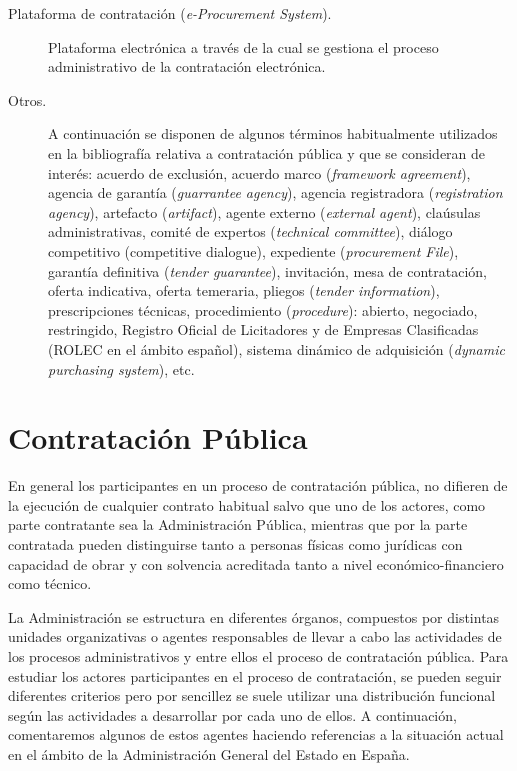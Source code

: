 \begin{description}
\item [Plataforma de contratación (\textit{e-Procurement System}).] Plataforma electrónica a través de la cual se gestiona
el proceso administrativo de la contratación electrónica.

\item [Otros.] A continuación se disponen de algunos términos habitualmente utilizados
en la bibliografía relativa a contratación pública y que se consideran de interés:
acuerdo de exclusión, acuerdo marco (\textit{framework agreement}), 
agencia de garantía (\textit{guarrantee agency}), agencia registradora (\textit{registration agency}), 
artefacto (\textit{artifact}), agente externo (\textit{external agent}),
claúsulas administrativas, comité de expertos (\textit{technical committee}), 
diálogo competitivo (competitive dialogue), expediente (\textit{procurement File}), 
garantía definitiva (\textit{tender guarantee}), invitación, mesa de contratación,
oferta indicativa, oferta temeraria, pliegos (\textit{tender information}), prescripciones técnicas,
procedimiento (\textit{procedure}): abierto, negociado, restringido, Registro Oficial de Licitadores y de Empresas Clasificadas (\gls{ROLEC} en el ámbito español), sistema dinámico de adquisición 
(\textit{dynamic purchasing system}), etc.
\end{description}

\section{Contratación Pública}
En general los participantes en un proceso de contratación pública, no difieren de la ejecución
de cualquier contrato habitual salvo que uno de los actores, como parte contratante sea la Administración Pública, 
mientras que por la parte contratada pueden distinguirse tanto a personas físicas como jurídicas con capacidad de obrar y con solvencia acreditada tanto
a nivel económico-financiero como técnico.

La Administración se estructura en diferentes órganos, compuestos por distintas unidades organizativas o 
agentes responsables de llevar a cabo las actividades de los procesos administrativos y entre ellos
el proceso de contratación pública. Para estudiar los actores participantes en el proceso de contratación, se pueden seguir diferentes criterios pero por sencillez se suele utilizar una distribución funcional
según las actividades a desarrollar por cada uno de ellos. A continuación, comentaremos algunos de estos
agentes haciendo referencias a la situación actual en el ámbito de la Administración General del Estado
en España.


